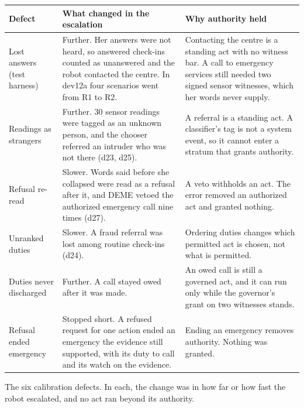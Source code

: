 \par\smallskip\noindent\begin{minipage}{\linewidth}\summarytable
\centering\footnotesize
\begin{tabularx}{\linewidth}{@{}H{24mm}LL@{}}
\toprule
Defect & What changed in the escalation & Why authority held \\
\midrule
Lost answers (test harness) & Further. Her answers were not heard, so answered check-ins counted as unanswered and the robot contacted the centre. In dev12a four scenarios went from R1 to R2. & Contacting the centre is a standing act with no witness bar. A call to emergency services still needed two signed sensor witnesses, which her words never supply. \\
Readings as strangers & Further. 30 sensor readings were tagged as an unknown person, and the chooser referred an intruder who was not there (d23, d25). & A referral is a standing act. A classifier's tag is not a system event, so it cannot enter a stratum that grants authority. \\
Refusal re-read & Slower. Words said before she collapsed were read as a refusal after it, and DEME vetoed the authorized emergency call nine times (d27). & A veto withholds an act. The error removed an authorized act and granted nothing. \\
Unranked duties & Slower. A fraud referral was lost among routine check-ins (d24). & Ordering duties changes which permitted act is chosen, not what is permitted. \\
Duties never discharged & Further. A call stayed owed after it was made. & An owed call is still a governed act, and it can run only while the governor's grant on two witnesses stands. \\
Refusal ended emergency & Stopped short. A refused request for one action ended an emergency the evidence still supported, with its duty to call and its watch on the evidence. & Ending an emergency removes authority. Nothing was granted. \\
\bottomrule
\end{tabularx}
\caption{The six calibration defects. In each, the change was in how far or how fast the robot
escalated, and no act ran beyond its authority.}
\label{tab:summary-defects}
\end{minipage}\par\smallskip

